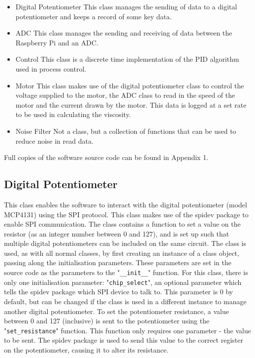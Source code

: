 \documentclass[twoside,a4]{report}
\def\br{\newline \newline \noindent}
\def\rpi{Raspberry Pi }
\begin{document}
	\begin{itemize}
		\item Digital Potentiometer \newline 
		This class manages the sending of data to a digital potentiometer and keeps a record of some key data.
		\item ADC \newline 
		This class manages the sending and receiving of data between the \rpi and an ADC.
		\item Control\newline 
		This class is a discrete time implementation of the PID algorithm used in process control.
		\item Motor \newline
		This class makes use of the digital potentiometer class to control the voltage supplied to the motor, the ADC class to read in the speed of the motor and the current drawn by the motor. This data is logged at a set rate to be used in calculating the viscosity.
		\item Noise Filter \newline
		Not a class, but a collection of functions that can be used to reduce noise in read data.
	\end{itemize}
	Full copies of the software source code can be found in Appendix 1.
	
	\subsection*{Digital Potentiometer} %
	This class enables the software to interact with the digital potentiometer (model MCP4131) using the SPI protocol. This class makes use of the spidev package to enable SPI communication. The class contains a function to set a value on the resistor (as an integer number between 0 and 127), and is set up such that multiple digital potentiometers can be included on the same circuit.\br
	The class is used, as with all normal classes, by first creating an instance of a class object, passing along the initialisation parameters. These parameters are set in the source code as the parameters to the "\texttt{\_\_init\_\_}" function. For this class, there is only one initialisation parameter: "\texttt{chip\_select}", an optional parameter which tells the spidev package which SPI device to talk to. This parameter is 0 by default, but can be changed if the class is used in a different instance to manage another digital potentiometer.\br
	To set the potentiometer resistance, a value between 0 and 127 (inclusive) is sent to the potentiometer using the "\texttt{set\_resistance}" function. This function only requires one parameter - the value to be sent. The spidev package is used to send this value to the correct register on the potentiometer, causing it to alter its resistance.
	
\end{document}
